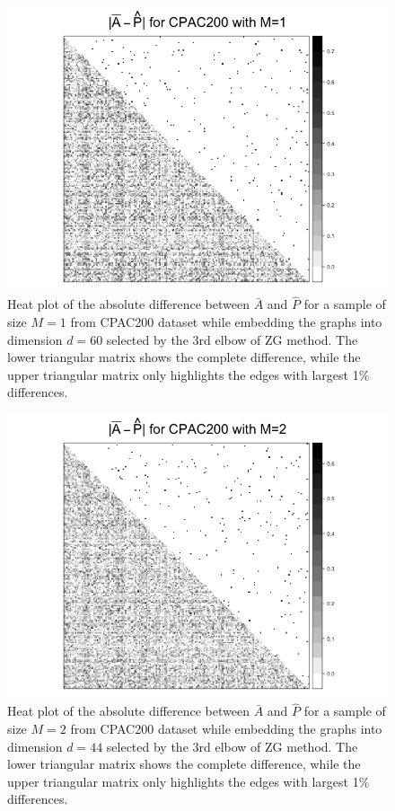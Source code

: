 \documentclass[a4paper]{article}
\begin{document}
\begin{figure}[!htb]
\centering
\includegraphics[width=1\textwidth]{Diff_CPAC200_m1.png}
\caption{Heat plot of the absolute difference between $\bar{A}$ and $\hat{P}$ for a sample of size $M=1$ from CPAC200 dataset while embedding the graphs into dimension $d=60$ selected by the 3rd elbow of ZG method. The lower triangular matrix shows the complete difference, while the upper triangular matrix only highlights the edges with largest 1\% differences.}
\label{fig:Diff_CPAC200_m1}
\end{figure}

\begin{figure}[!htb]
\centering
\includegraphics[width=1\textwidth]{Diff_CPAC200_m2.png}
\caption{Heat plot of the absolute difference between $\bar{A}$ and $\hat{P}$ for a sample of size $M=2$ from CPAC200 dataset while embedding the graphs into dimension $d=44$ selected by the 3rd elbow of ZG method. The lower triangular matrix shows the complete difference, while the upper triangular matrix only highlights the edges with largest 1\% differences.}
\label{fig:Diff_CPAC200_m2}
\end{figure}
\end{document}
